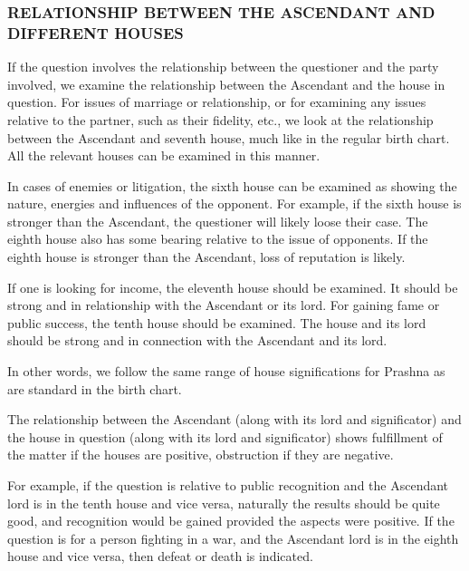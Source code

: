  

\subsubsection{RELATIONSHIP BETWEEN THE ASCENDANT AND DIFFERENT HOUSES}

 

If the question involves the relationship between the questioner and the party involved, we examine the relationship between the Ascendant and the house in question. For issues of marriage or relationship, or for examining any issues relative to the partner, such as their fidelity, etc., we look at the relationship between the Ascendant and seventh house, much like in the regular birth chart. All the relevant houses can be examined in this manner.

 

In cases of enemies or litigation, the sixth house can be examined as showing the nature, energies and influences of the opponent. For example, if the sixth house is stronger than the Ascendant, the questioner will likely loose their case. The eighth house also has some bearing relative to the issue of opponents. If the eighth house is stronger than the Ascendant, loss of reputation is likely.

 

If one is looking for income, the eleventh house should be examined. It should be strong and in relationship with the Ascendant or its lord. For gaining fame or public success, the tenth house should be examined. The house and its lord should be strong and in connection with the Ascendant and its lord.

 

In other words, we follow the same range of house significations for Prashna as are standard in the birth chart.

 

The relationship between the Ascendant (along with its lord and significator) and the house in question (along with its lord and significator) shows fulfillment of the matter if the houses are positive, obstruction if they are negative.

 

For example, if the question is relative to public recognition and the Ascendant lord is in the tenth house and vice versa, naturally the results should be quite good, and recognition would be gained provided the aspects were positive. If the question is for a person fighting in a war, and the Ascendant lord is in the eighth house and vice versa, then defeat or death is indicated.

